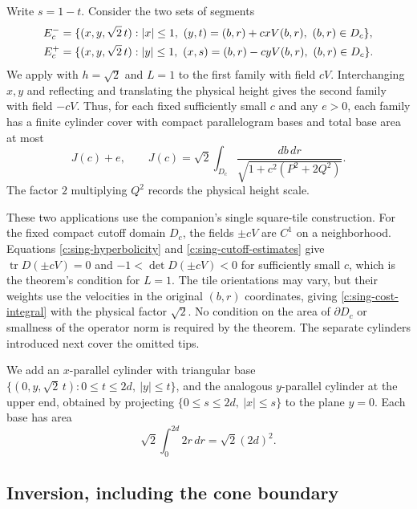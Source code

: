 Write $s=1-t$.  Consider the two sets of segments
\begin{align}
 E_c^-&=\{(x,y,\sqrt{2}\,t): |x|\le1,
            \ (y,t)=(b,r)+cxV(b,r),\ (b,r)\in D_c\},\notag\\
 E_c^+&=\{(x,y,\sqrt{2}\,t): |y|\le1,
            \ (x,s)=(b,r)-cyV(b,r),\ (b,r)\in D_c\}.
 \label{c:sing-families}
\end{align}
We apply \BScaling{} with $h=\sqrt{2}$ and $L=1$ to the first
family with field $cV$.
Interchanging $x,y$ and
reflecting and translating the physical height gives the second family
with field $-cV$.  Thus, for each fixed sufficiently small $c$ and any
$e>0$, each family has a finite cylinder cover with compact
parallelogram bases and total base area at most
\begin{equation}
 J(c)+e,
 \qquad
 J(c)=\sqrt{2}\int_{D_c}
       \frac{db\,dr}{\sqrt{1+c^2(P^2+2Q^2)}}.
 \label{c:sing-cost-integral}
\end{equation}
The factor $2$ multiplying $Q^2$ records the physical height scale.

These two applications use the companion's single square-tile
construction. For the fixed compact cutoff domain $D_c$, the fields
$\pm cV$ are $C^1$ on a neighborhood. Equations
\eqref{c:sing-hyperbolicity} and \eqref{c:sing-cutoff-estimates}
give $\operatorname{tr}D(\pm cV)=0$ and
$-1<\det D(\pm cV)<0$ for sufficiently small $c$, which is the
theorem's condition for $L=1$. The tile orientations may vary, but
their weights use the velocities in the original $(b,r)$ coordinates,
giving \eqref{c:sing-cost-integral} with the physical factor $\sqrt2$.
No condition on the area of $\partial D_c$ or smallness of the
operator norm is required by the theorem. The separate cylinders
introduced next cover the omitted tips.


We add an $x$-parallel cylinder with triangular base
$\{(0,y,\sqrt{2}\,t):0\le t\le2d,\ |y|\le t\}$,
and the analogous $y$-parallel cylinder at the upper end, obtained by
projecting $\{0\le s\le2d,\ |x|\le s\}$ to the plane $y=0$.
Each base has area
\begin{equation}
 \sqrt{2}\int_0^{2d}2r\,dr
       =\sqrt{2}(2d)^2.
 \label{c:sing-tip-cost}
\end{equation}

\subsection{Inversion, including the cone boundary}

